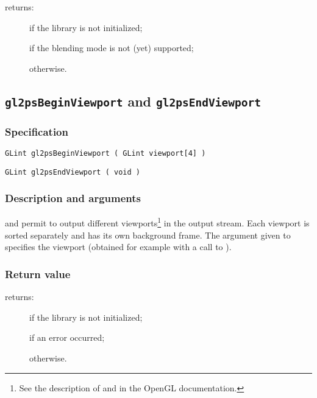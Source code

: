 \noindent{} returns:
\begin{description}
\item[] if the library is not initialized;
\item[] if the blending mode is not (yet) supported;
\item[] otherwise.
\end{description}


\subsection{\texttt{gl2psBeginViewport} and \texttt{gl2psEndViewport}}
\label{sec:gl2psBeginViewport}

\subsubsection{Specification}

\begin{verbatim}
GLint gl2psBeginViewport ( GLint viewport[4] )
\end{verbatim}

\begin{verbatim}
GLint gl2psEndViewport ( void )
\end{verbatim}

\subsubsection{Description and arguments}

 and  permit to output different
viewports\footnote{See the description of  and 
in the OpenGL documentation.} in the output stream. Each viewport is sorted
separately and has its own background frame. The argument given to
 specifies the viewport (obtained for example with a
call to ).

\subsubsection{Return value}

\noindent{} returns:
\begin{description}
\item[] if the library is not initialized;
\item[] if an error occurred;
\item[] otherwise.
\end{description}

